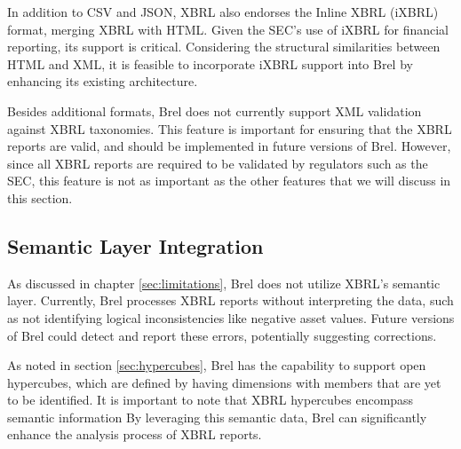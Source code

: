 In addition to CSV and JSON, XBRL also endorses the Inline XBRL (iXBRL) format, merging XBRL with HTML.
Given the SEC's use of iXBRL for financial reporting, its support is critical.
Considering the structural similarities between HTML and XML, it is feasible to incorporate iXBRL support into Brel by enhancing its existing architecture.

Besides additional formats, Brel does not currently support XML validation against XBRL taxonomies.
This feature is important for ensuring that the XBRL reports are valid, and should be implemented in future versions of Brel.
However, since all XBRL reports are required to be validated by regulators such as the SEC, this feature is not as important as the other features that we will discuss in this section.



\subsection{Semantic Layer Integration}

As discussed in chapter \ref{sec:limitations}, Brel does not utilize XBRL's semantic layer.
Currently, Brel processes XBRL reports without interpreting the data, such as not identifying logical inconsistencies like negative asset values.
Future versions of Brel could detect and report these errors, potentially suggesting corrections.

As noted in section \ref{sec:hypercubes}, Brel has the capability to support open hypercubes,
which are defined by having dimensions with members that are yet to be identified.
It is important to note that XBRL hypercubes encompass semantic information\cite{xbrl_dimensions_technical_considerations}
By leveraging this semantic data, Brel can significantly enhance the analysis process of XBRL reports.

